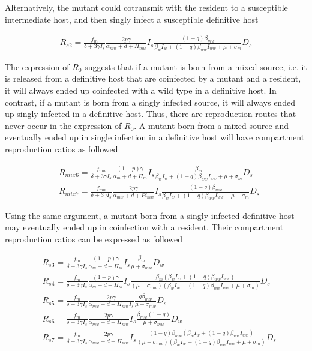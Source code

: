 \documentclass{article}
\begin{document}
Alternatively, the mutant could cotransmit with the resident to a susceptible intermediate host, and then singly infect a susceptible definitive host

\begin{align}
R_{s2} = \frac{f_m}{\delta +3 \gamma  I_s} \frac{2 p \gamma }{\alpha_{mw} + d + \Pi_{mw}} I_s \frac{ (1-q)\beta_{mw}}{\beta_w I_w +  (1- q) \beta_{ww} I_{ww} +\mu +\sigma_m} D_s
\end{align}

The expression of $R_0$ suggests that if a mutant is born from a mixed source, i.e. it is released from a definitive host that are coinfected by a mutant and a resident, it will always ended up coinfected with a wild type in a definitive host. In contrast, if a mutant is born from a singly infected source, it will always ended up singly infected in a definitive host. Thus, there are reproduction routes that never occur in the expression of $R_0$. A mutant born from a mixed source and eventually ended up in single infection in a definitive host will have compartment reproduction ratios as followed

\begin{align}
& R_{mix6} = \frac{f_{mw}}{\delta + 3 \gamma I_s} \frac{(1-p) \gamma}{\alpha_m + d + \Pi_m} I_s \frac{\beta_m}{\beta_w I_w + (1-q) \beta_{ww} I_{ww} + \mu + \sigma_m} D_s \\
& R_{mix7} = \frac{f_{mw}}{\delta + 3 \gamma I_s} \frac{2 p \gamma}{\alpha_{mw} + d + Pi_{mw}} I_s \frac{(1-q)\beta_{mw}}{\beta_w I_w + (1-q) \beta_{ww} I_{ww} + \mu + \sigma_m} D_s
\end{align}

Using the same argument, a mutant born from a singly infected definitive host may eventually ended up in coinfection with a resident. Their compartment reproduction ratios can be expressed as followed

\begin{align}
& R_{s3} = \frac{f_m}{\delta + 3 \gamma I_s}  \frac{(1-p) \gamma}{\alpha_m + d + \Pi_m} I_s \frac{\beta_m }{\mu +\sigma_{mw}} D_w \\
& R_{s4} = \frac{f_{m}}{\delta +3 \gamma  I_s} \frac{(1-p) \gamma}{\alpha_m + d + \Pi_m} I_s \frac{\beta_m (\beta_w I_w + (1-q) \beta_{ww} I_{ww})}{(\mu + \sigma_{mw}) (\beta_w I_w +  (1- q)\beta_{ww} I_{ww} + \mu + \sigma_m)} D_s \\
& R_{s5} = \frac{f_{m}}{\delta + 3 \gamma  I_s} \frac{2 p \gamma}{\alpha_{mw} + d + \Pi_{mw} I_s} \frac{q \beta_{mw}}{\mu + \sigma_{mw}} D_s \\
& R_{s6} = \frac{f_{m}}{\delta +3 \gamma  I_s} \frac{2 p \gamma}{\alpha_{mw} + d + \Pi_{mw}} I_s \frac{\beta_{mw} (1-q)}{\mu + \sigma_{mw}} D_w \\
& R_{s7} = \frac{f_{m}}{\delta + 3 \gamma  I_s} \frac{2 p \gamma }{\alpha_{mw} + d + \Pi_{mw}} I_s \frac{(1-q) \beta_{mw}  (\beta_w I_w +(1-q) \beta_{ww} I_{ww} )}{(\mu +\sigma_{mw}) (\beta_w I_w +  (1-q)\beta_{ww} I_{ww} +\mu + \sigma_m)} D_s
\end{align}
\end{document}
